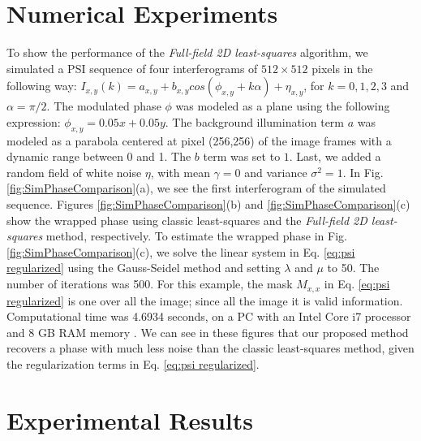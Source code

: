 \section{Numerical Experiments}
To show the performance of the \textit{Full-field 2D least-squares} algorithm,
we simulated a PSI sequence of four interferograms of $512 \times 512$ pixels 
in the following way: $I_{x,y} (k) = a_{x,y} + b_{x,y} cos(\phi_{x,y}+k\alpha) +
\eta_{x,y}$, for $k=0,1,2,3$ and $\alpha=\pi/2$. The modulated phase $\phi$ was
modeled as a plane using the following expression: $\phi_{x,y}=0.05x+0.05y$. The
background illumination term $a$ was modeled as a parabola centered at pixel
(256,256) of the image frames with a dynamic range between 0 and 1. The $b$ term
was set to $1$. Last, we added a random field of white noise $\eta$, with mean
$\gamma=0$ and variance $\sigma^2=1$. In Fig. \ref{fig:SimPhaseComparison}(a),
we see the first interferogram of the simulated sequence. Figures 
\ref{fig:SimPhaseComparison}(b) and \ref{fig:SimPhaseComparison}(c) show the
wrapped phase using classic least-squares \cite{Greivenkamp} and the
\textit{Full-field 2D least-squares} method, respectively. To estimate the
wrapped phase in Fig. \ref{fig:SimPhaseComparison}(c), we solve the linear
system in Eq. \eqref{eq:psi regularized} using the Gauss-Seidel method and
setting $\lambda$ and $\mu$ to 50. The number of iterations was 500. For
this example, the mask $M_{x,x}$ in Eq. \eqref{eq:psi regularized} is one over
all the image; since all the image it is valid information. Computational
time was 4.6934 seconds, on a PC with an Intel Core i7 processor and 8 GB RAM
memory . We can see in these figures that our proposed method recovers a phase
with much less noise than the classic least-squares method, given the
regularization terms in Eq. \eqref{eq:psi regularized}.

\section{Experimental Results}

